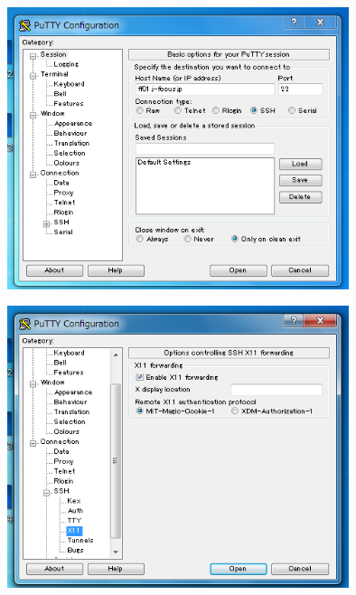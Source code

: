 \documentclass[12pt,a4paper,dvipdfmx]{jarticle}
\begin{document}
\begin{figure}
  \begin{center}
    \includegraphics[clip, width=10.0cm]{fig/PuTTY4_.png}
  \end{center}
  \caption{}
  \label{fig:PuTTY4}
\end{figure}

\begin{figure}
  \begin{center}
    \includegraphics[clip, width=10.0cm]{fig/PuTTY5_.png}
  \end{center}
  \caption{}
  \label{fig:PuTTY5}
\end{figure}
\end{document}

